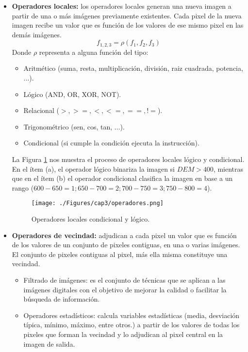 	\begin{itemize}
		\item \textbf{Operadores locales:} los operadores locales generan una nueva imagen a partir de una o m\'as im\'agenes previamente existentes. Cada pixel de la nueva imagen recibe un valor que es funci\'on de los valores de ese mismo pixel en las dem\'as im\'agenes.
		\begin{equation}
		\label{e:opLoc}
		f_{1,2,3}=\rho(f_{1},f_{2},f_{3})
		\end{equation}
		Donde $ \rho $ representa a alguna funci\'on del tipo:
		\begin{itemize}
			\item Aritm\'etico (suma, resta, multiplicaci\'on, divisi\'on, raiz cuadrada, potencia, ...).
			\item L\'ogico (AND, OR, XOR, NOT).
			\item Relacional ($ >, >=, <, <=, ==, != $).
			\item Trigonom\'etrico (sen, cos, tan, ...).
			\item Condicional (si cumple la condici\'on ejecuta la instrucci\'on).
		\end{itemize}
		La Figura \ref{fig:oploccond} nos muestra el proceso de operadores locales l\'ogico y condicional. En el \'item (a), el operador l\'ogico binariza la imagen si $ DEM > 400 $, mientras que en el \'item (b) el operador condicional clasifica la imagen en base a un rango ($ 600 - 650 = 1; 650 - 700 = 2; 700 - 750 = 3; 750 - 800 = 4 $).
		  \begin{figure}[H]
		  	\centering
		  	\texttt{[image: ./Figures/cap3/operadores.png]}
		  	\caption{Operadores locales condicional y l\'ogico.}
		  	\label{fig:oploccond}
		  \end{figure}
		\item  \textbf{Operadores de vecindad:} adjudican a cada pixel un valor que es funci\'on de los valores de un conjunto de pixeles contiguas, en una o varias im\'agenes. El conjunto de pixeles contiguas al pixel, m\'as ella misma constituye una vecindad.
		\begin{itemize}
			\item Filtrado de im\'agenes: es el conjunto de t\'ecnicas que se aplican a las im\'agenes digitales con el objetivo de mejorar la calidad o facilitar la b\'usqueda de informaci\'on.
			\item Operadores estad\'isticos: calcula variables estad\'isticas (media, desviaci\'on t\'ipica, m\'inimo, m\'aximo, entre otros.) a partir de los valores de todas los pixeles que forman la vecindad y lo adjudican al pixel central en la imagen de salida. 

\end{itemize}
\end{itemize}
